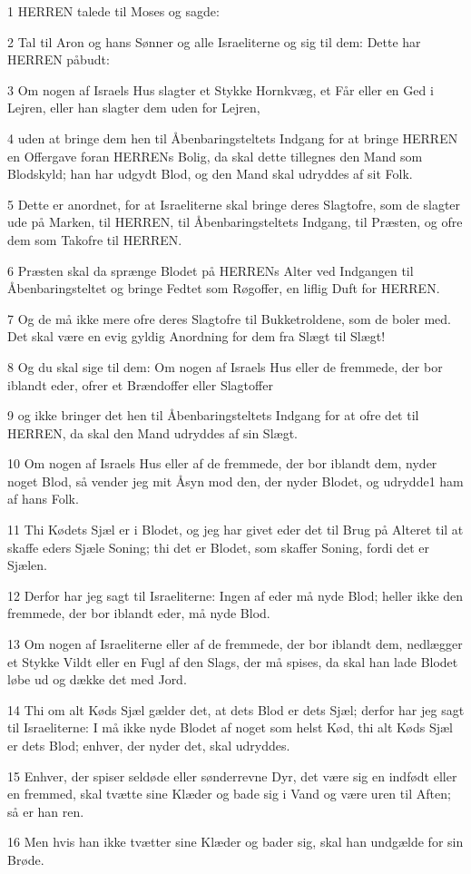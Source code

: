\par 1 HERREN talede til Moses og sagde:
\par 2 Tal til Aron og hans Sønner og alle Israeliterne og sig til dem: Dette har HERREN påbudt:
\par 3 Om nogen af Israels Hus slagter et Stykke Hornkvæg, et Får eller en Ged i Lejren, eller han slagter dem uden for Lejren,
\par 4 uden at bringe dem hen til Åbenbaringsteltets Indgang for at bringe HERREN en Offergave foran HERRENs Bolig, da skal dette tillegnes den Mand som Blodskyld; han har udgydt Blod, og den Mand skal udryddes af sit Folk.
\par 5 Dette er anordnet, for at Israeliterne skal bringe deres Slagtofre, som de slagter ude på Marken, til HERREN, til Åbenbaringsteltets Indgang, til Præsten, og ofre dem som Takofre til HERREN.
\par 6 Præsten skal da sprænge Blodet på HERRENs Alter ved Indgangen til Åbenbaringsteltet og bringe Fedtet som Røgoffer, en liflig Duft for HERREN.
\par 7 Og de må ikke mere ofre deres Slagtofre til Bukketroldene, som de boler med. Det skal være en evig gyldig Anordning for dem fra Slægt til Slægt!
\par 8 Og du skal sige til dem: Om nogen af Israels Hus eller de fremmede, der bor iblandt eder, ofrer et Brændoffer eller Slagtoffer
\par 9 og ikke bringer det hen til Åbenbaringsteltets Indgang for at ofre det til HERREN, da skal den Mand udryddes af sin Slægt.
\par 10 Om nogen af Israels Hus eller af de fremmede, der bor iblandt dem, nyder noget Blod, så vender jeg mit Åsyn mod den, der nyder Blodet, og udrydde1 ham af hans Folk.
\par 11 Thi Kødets Sjæl er i Blodet, og jeg har givet eder det til Brug på Alteret til at skaffe eders Sjæle Soning; thi det er Blodet, som skaffer Soning, fordi det er Sjælen.
\par 12 Derfor har jeg sagt til Israeliterne: Ingen af eder må nyde Blod; heller ikke den fremmede, der bor iblandt eder, må nyde Blod.
\par 13 Om nogen af Israeliterne eller af de fremmede, der bor iblandt dem, nedlægger et Stykke Vildt eller en Fugl af den Slags, der må spises, da skal han lade Blodet løbe ud og dække det med Jord.
\par 14 Thi om alt Køds Sjæl gælder det, at dets Blod er dets Sjæl; derfor har jeg sagt til Israeliterne: I må ikke nyde Blodet af noget som helst Kød, thi alt Køds Sjæl er dets Blod; enhver, der nyder det, skal udryddes.
\par 15 Enhver, der spiser seldøde eller sønderrevne Dyr, det være sig en indfødt eller en fremmed, skal tvætte sine Klæder og bade sig i Vand og være uren til Aften; så er han ren.
\par 16 Men hvis han ikke tvætter sine Klæder og bader sig, skal han undgælde for sin Brøde.

